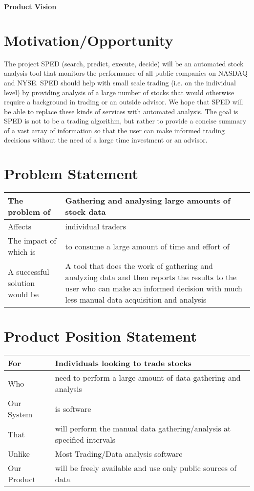 \documentclass[12pt]{article}
\begin{document}
\centerline{\bf Product Vision}

\section{Motivation/Opportunity} 

The project SPED (search, predict, execute, decide) will be an automated stock analysis tool that monitors the performance of all public companies on NASDAQ and NYSE. SPED should help with small scale trading (i.e. on the individual level) by providing analysis of a large number of stocks that would otherwise require a background in trading or an outside advisor. We hope that SPED will be able to replace these kinds of services with automated analysis. The goal is SPED is not to be a trading algorithm, but rather to provide a concise summary of a vast array of information so that the user can make informed trading decisions without the need of a large time investment or an advisor.

\section{Problem Statement}

\begin{center}
    \begin{tabular}{ |  l | p{5cm} |}
    \hline
    The problem of & Gathering and analysing large amounts of stock data\\ \hline
    Affects & individual traders  \\ \hline
    The impact of which is & to consume a large amount of time and effort of \\ \hline
    A successful solution would be & A tool that does the work of gathering and analyzing data and then reports the results to the user who can make an informed decision with much less manual data acquisition and analysis\\  \hline
    \end{tabular}
\end{center}

\section{Product Position Statement}

\begin{center}
    \begin{tabular}{ |  l | p{5cm} |}
    \hline
    For & Individuals looking to trade stocks\\ \hline
    Who & need to perform a large amount of data gathering and analysis \\ \hline
    Our System & is software\\ \hline
    That & will perform the manual data gathering/analysis at specified intervals\\  \hline
    Unlike & Most Trading/Data analysis software\\  \hline
    Our  Product & will be freely available and use only public sources of data\\  \hline
    \end{tabular}
\end{center}
\end{document}
